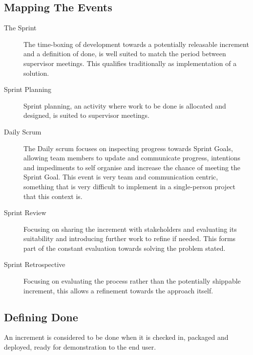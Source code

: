 \subsection{Mapping The Events}

\begin{description}
	\item[The Sprint] The time-boxing of development towards a potentially releasable increment and a definition of done, is well suited to match the period between supervisor meetings. This qualifies traditionally as implementation of a solution.
	
	\item[Sprint Planning] Sprint planning, an activity where work to be done is allocated and designed, is suited to supervisor meetings. 
	
	\item[Daily Scrum] The Daily scrum focuses on inspecting progress towards Sprint Goals, allowing team members to update and communicate progress, intentions and impediments to self organise and increase the chance of meeting the Sprint Goal. This event is very team and communication centric, something that is very difficult to implement in a single-person project that this context is.
	
	\item[Sprint Review] Focusing on sharing the increment with stakeholders and evaluating its suitability and introducing further work to refine if needed. This forms part of the constant evaluation towards solving the problem stated. 
	
	\item[Sprint Retrospective] Focusing on evaluating the process rather than the potentially shippable increment, this allows a refinement towards the approach itself.
	
\end{description}


%

\subsection{Defining Done}

An increment is considered to be done when it is checked in, packaged and deployed, ready for demonstration to the end user. 